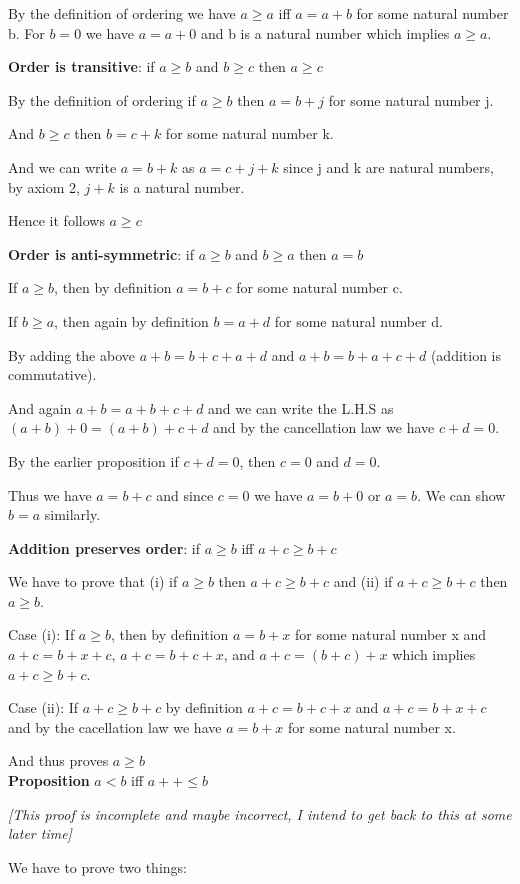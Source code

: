\documentclass[10pt]{article}
\begin{document}
By the definition of ordering we have $a \geq a$ iff $a = a+b$ for some natural
number b. For $b=0$ we have $a= a+0$ and b is a natural number which implies $a
\geq a$.

\textbf{Order is transitive}: if $a \geq b$ and $b \geq c$ then $a \geq c$

By the definition of ordering if $a \geq b$ then $a=b+j$ for some natural number
j.

And $b \geq c$ then $b=c+k$ for some natural number k.

And we can write $a=b+k$ as $a=c+j+k$ since j and k are natural numbers, by
axiom 2, $j+k$ is a natural number.

Hence it follows $a \geq c$

\textbf{Order is anti-symmetric}: if $a \geq b$ and $b \geq a$ then $a=b$

If $a \geq b$, then by definition $a = b+c$ for some natural number c.

If $b \geq a$, then again by definition $b=a+d$ for some natural number d.

By adding the above $a+b = b+c+a+d$ and $a+b = b+a+c+d$ (addition is
commutative).

And again $a+b=a+b+c+d$ and we can write the L.H.S as $(a+b)+0 = (a+b)+c+d$ and
by the cancellation law we have $c+d=0$.

By the earlier proposition if $c+d=0$, then $c=0$ and $d=0$.

Thus we have $a=b+c$ and since $c=0$ we have $a=b+0$ or $a=b$. We can show $b=a$
similarly.

\textbf{Addition preserves order}: if $a \geq b$ iff $a+c \geq b+c$

We have to prove that (i) if $a \geq b$ then $a+c \geq b+c$ and (ii) if $a+c
\geq b+c$ then $a \geq b$.

Case (i): If $a \geq b$, then by definition $a=b+x$ for some natural number x
and $a+c = b+x+c$, $a+c = b+c+x$, and $a+c = (b+c)+x$ which implies $a+c \geq
b+c$.

Case (ii): If $a+c \geq b+c$ by definition $a+c = b+c+x$ and $a+c = b+x+c$ and
by the cacellation law we have $a = b+x$ for some natural number x.

And thus proves $a \geq b$
\\[5pt]
\textbf{Proposition} $a < b$ iff $a++ \leq b$

\emph{[This proof is incomplete and maybe incorrect, I intend to get back to
    this at some later time]}

We have to prove two things:
\end{document}

